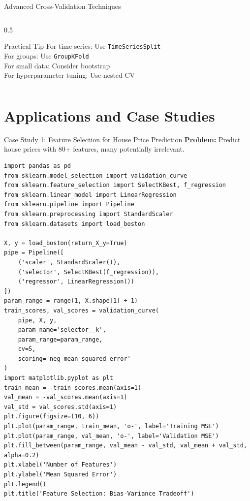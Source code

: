 \documentclass[aspectratio=169,11pt]{beamer}
\begin{document}
\begin{frame}{Advanced Cross-Validation Techniques}
\begin{columns}
\begin{column}{0.5\textwidth}
\begin{alertblock}{Practical Tip}
For time series: Use \texttt{TimeSeriesSplit}\\
For groups: Use \texttt{GroupKFold}\\
For small data: Consider bootstrap\\
For hyperparameter tuning: Use nested CV
\end{alertblock}
\end{column}
\end{columns}
\end{frame}

\section{Applications and Case Studies}

\begin{frame}[fragile]{Case Study 1: Feature Selection for House Price Prediction}
\textbf{Problem:} Predict house prices with 80+ features, many potentially irrelevant.

\begin{lstlisting}[basicstyle=\ttfamily\tiny]
import pandas as pd
from sklearn.model_selection import validation_curve
from sklearn.feature_selection import SelectKBest, f_regression
from sklearn.linear_model import LinearRegression
from sklearn.pipeline import Pipeline
from sklearn.preprocessing import StandardScaler
from sklearn.datasets import load_boston

X, y = load_boston(return_X_y=True)
pipe = Pipeline([
    ('scaler', StandardScaler()),
    ('selector', SelectKBest(f_regression)),
    ('regressor', LinearRegression())
])
param_range = range(1, X.shape[1] + 1)
train_scores, val_scores = validation_curve(
    pipe, X, y,
    param_name='selector__k',
    param_range=param_range,
    cv=5,
    scoring='neg_mean_squared_error'
)
import matplotlib.pyplot as plt
train_mean = -train_scores.mean(axis=1)
val_mean = -val_scores.mean(axis=1)
val_std = val_scores.std(axis=1)
plt.figure(figsize=(10, 6))
plt.plot(param_range, train_mean, 'o-', label='Training MSE')
plt.plot(param_range, val_mean, 'o-', label='Validation MSE')
plt.fill_between(param_range, val_mean - val_std, val_mean + val_std, alpha=0.2)
plt.xlabel('Number of Features')
plt.ylabel('Mean Squared Error')
plt.legend()
plt.title('Feature Selection: Bias-Variance Tradeoff')
\end{lstlisting}
\end{frame}
\end{document}
